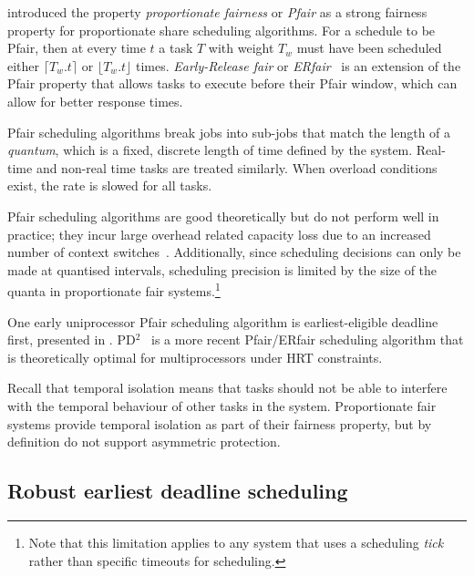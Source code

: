 \citet{Baruah_CPV_96} introduced the property \emph{proportionate fairness} or \emph{Pfair} as a
strong fairness property for proportionate share scheduling algorithms.  For a schedule to be Pfair,
then at every time $t$ a task $T$ with weight $T_{w}$ must have been scheduled either $\lceil T_{w}
. t \rceil$ or $\lfloor T_{w}.t \rfloor $ times.  \emph{Early-Release fair} or
\emph{ERfair}~\citep{Anderson_Srinivasan_04} is an extension of the Pfair property that allows tasks to
execute before their Pfair window, which can allow for better response times.

Pfair scheduling algorithms break jobs into sub-jobs that match the length of a \emph{quantum},
which is a fixed, discrete length of time defined by the system.
Real-time and non-real time tasks are treated similarly.
When overload conditions exist, the rate is slowed for all tasks.

Pfair scheduling algorithms are good theoretically but do not perform well in practice; they incur
large overhead related capacity loss due to an increased number of context
switches~\citep{Abeni_Buttazzo_04}. Additionally, since
scheduling decisions can only be made at quantised intervals, scheduling precision is limited by the
size of the quanta in proportionate fair systems.\footnote{Note that this limitation applies to any
    system that uses a scheduling \emph{tick} rather than specific timeouts for scheduling.}

One early uniprocessor Pfair scheduling algorithm is earliest-eligible deadline first, presented in
\citet{Stoica_AKBGP_96}.  PD$^{2}$~\citep{Srinivasan_Anderson_06} is a more recent Pfair/ERfair
scheduling algorithm that is theoretically optimal for multiprocessors under \gls{HRT} constraints.

Recall that temporal isolation means that tasks should not be able to interfere with the temporal
behaviour of other tasks in the system.  Proportionate fair systems provide temporal isolation as
part of their fairness property, but by definition do not support asymmetric protection.

\subsection{Robust earliest deadline scheduling}

